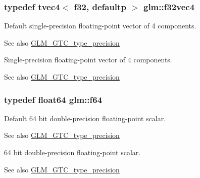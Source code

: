 \subsubsection[{f32vec4}]{\setlength{\rightskip}{0pt plus 5cm}typedef tvec4$<$ f32, defaultp $>$ {\bf glm\+::f32vec4}}\label{group__gtc__type__precision_ga6848e3b5cb5c1f4c117717b309e726eb}
Default single-\/precision floating-\/point vector of 4 components. \begin{DoxySeeAlso}{See also}
\hyperlink{group__gtc__type__precision}{G\+L\+M\+\_\+\+G\+T\+C\+\_\+type\+\_\+precision}
\end{DoxySeeAlso}
Single-\/precision floating-\/point vector of 4 components. \begin{DoxySeeAlso}{See also}
\hyperlink{group__gtc__type__precision}{G\+L\+M\+\_\+\+G\+T\+C\+\_\+type\+\_\+precision} 
\end{DoxySeeAlso}
\hypertarget{group__gtc__type__precision_ga2bba392e555124b36cde6abba349bab3}{}
\subsubsection[{f64}]{\setlength{\rightskip}{0pt plus 5cm}typedef float64 {\bf glm\+::f64}}\label{group__gtc__type__precision_ga2bba392e555124b36cde6abba349bab3}
Default 64 bit double-\/precision floating-\/point scalar. \begin{DoxySeeAlso}{See also}
\hyperlink{group__gtc__type__precision}{G\+L\+M\+\_\+\+G\+T\+C\+\_\+type\+\_\+precision}
\end{DoxySeeAlso}
64 bit double-\/precision floating-\/point scalar. \begin{DoxySeeAlso}{See also}
\hyperlink{group__gtc__type__precision}{G\+L\+M\+\_\+\+G\+T\+C\+\_\+type\+\_\+precision} 
\end{DoxySeeAlso}
\hypertarget{group__gtc__type__precision_gaf66aa8b74ef627da80162c17a74a04fe}{}

